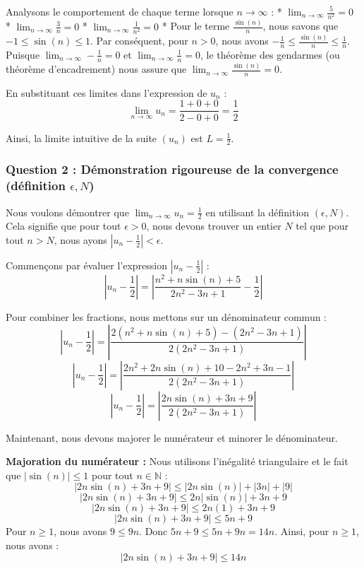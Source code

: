 \documentclass[a4paper,11pt]{report}
\begin{document}
Analysons le comportement de chaque terme lorsque $n \to \infty$ :
*   $\lim_{n \to \infty} \frac{5}{n^2} = 0$
*   $\lim_{n \to \infty} \frac{3}{n} = 0$
*   $\lim_{n \to \infty} \frac{1}{n^2} = 0$
*   Pour le terme $\frac{\sin(n)}{n}$, nous savons que $-1 \le \sin(n) \le 1$. Par conséquent, pour $n > 0$, nous avons $-\frac{1}{n} \le \frac{\sin(n)}{n} \le \frac{1}{n}$.
    Puisque $\lim_{n \to \infty} -\frac{1}{n} = 0$ et $\lim_{n \to \infty} \frac{1}{n} = 0$, le théorème des gendarmes (ou théorème d'encadrement) nous assure que $\lim_{n \to \infty} \frac{\sin(n)}{n} = 0$.

En substituant ces limites dans l'expression de $u_n$ :
$$\lim_{n \to \infty} u_n = \frac{1 + 0 + 0}{2 - 0 + 0} = \frac{1}{2}$$

Ainsi, la limite intuitive de la suite $(u_n)$ est $L = \frac{1}{2}$.

\subsubsection*{Question 2 : Démonstration rigoureuse de la convergence (définition $\epsilon, N$)}

Nous voulons démontrer que $\lim_{n \to \infty} u_n = \frac{1}{2}$ en utilisant la définition $(\epsilon, N)$.
Cela signifie que pour tout $\epsilon > 0$, nous devons trouver un entier $N$ tel que pour tout $n > N$, nous ayons $|u_n - \frac{1}{2}| < \epsilon$.

Commençons par évaluer l'expression $|u_n - \frac{1}{2}|$ :
$$|u_n - \frac{1}{2}| = \left|\frac{n^2 + n\sin(n) + 5}{2n^2 - 3n + 1} - \frac{1}{2}\right|$$

Pour combiner les fractions, nous mettons sur un dénominateur commun :
$$|u_n - \frac{1}{2}| = \left|\frac{2(n^2 + n\sin(n) + 5) - (2n^2 - 3n + 1)}{2(2n^2 - 3n + 1)}\right|$$
$$|u_n - \frac{1}{2}| = \left|\frac{2n^2 + 2n\sin(n) + 10 - 2n^2 + 3n - 1}{2(2n^2 - 3n + 1)}\right|$$
$$|u_n - \frac{1}{2}| = \left|\frac{2n\sin(n) + 3n + 9}{2(2n^2 - 3n + 1)}\right|$$

Maintenant, nous devons majorer le numérateur et minorer le dénominateur.

\textbf{Majoration du numérateur :}
Nous utilisons l'inégalité triangulaire et le fait que $|\sin(n)| \le 1$ pour tout $n \in \mathbb{N}$ :
$$|2n\sin(n) + 3n + 9| \le |2n\sin(n)| + |3n| + |9|$$
$$|2n\sin(n) + 3n + 9| \le 2n|\sin(n)| + 3n + 9$$
$$|2n\sin(n) + 3n + 9| \le 2n(1) + 3n + 9$$
$$|2n\sin(n) + 3n + 9| \le 5n + 9$$
Pour $n \ge 1$, nous avons $9 \le 9n$. Donc $5n+9 \le 5n+9n = 14n$.
Ainsi, pour $n \ge 1$, nous avons :
$$|2n\sin(n) + 3n + 9| \le 14n$$
\end{document}
